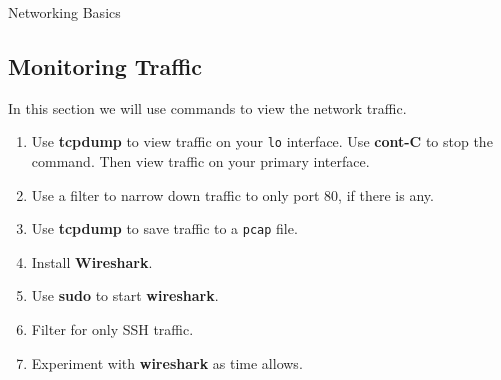 \begin{Lab}
\begin{exe} {Networking Basics}
	        \subsection*{Monitoring Traffic}
		In this section we will use commands to
		view the network traffic.
        \begin{enumerate}
		\item Use \textbf{tcpdump} to view traffic
			on your \verb:lo: interface. Use
			\textbf{cont-C} to stop the command.
			Then view traffic on your primary
			interface.
		\item
			Use a filter to narrow down traffic to
			only port 80, if there is any.
		\item
			Use \textbf{tcpdump} to save traffic
			to a \verb:pcap: file.

		\item
			Install \textbf{Wireshark}. 
		\item
			Use \textbf{sudo} to start
			\textbf{wireshark}.
		\item
			Filter for only SSH traffic. 
		\item 
			Experiment with \textbf{wireshark} as 
			time allows.
        \end{enumerate}

\end{exe}
\end{Lab}
